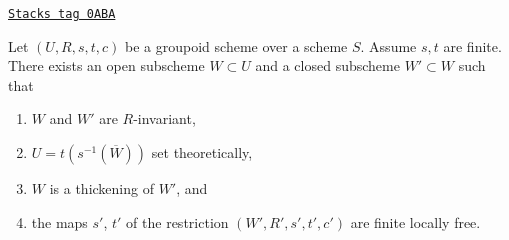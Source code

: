 \begin{lemma}
\label{more-groupoids-lemma-finite-flat-over-almost-dense-subscheme}
\href{https://stacks.math.columbia.edu/tag/0ABA}{\texttt{Stacks tag 0ABA}}

Let $(U, R, s, t, c)$ be a groupoid scheme over a scheme $S$. Assume $s, t$
are finite. There exists an open subscheme $W \subset U$ and a closed
subscheme $W' \subset W$ such that
\begin{enumerate}
\item $W$ and $W'$ are $R$-invariant,
\item $U = t(s^{-1}(\overline{W}))$ set theoretically,
\item $W$ is a thickening of $W'$, and
\item the maps $s'$, $t'$ of the restriction $(W', R', s', t', c')$
are finite locally free.
\end{enumerate}
\end{lemma}


